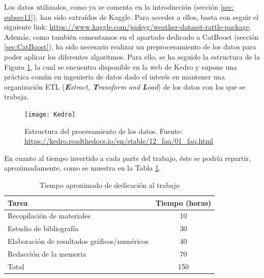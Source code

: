 \documentclass[12pt,twoside]{article}
\begin{document}
Los datos utilizados, como ya se comenta en la introducción (sección \ref{sec: subsec11}), han sido extraídos de Kaggle. Para acceder a ellos, basta con seguir el siguiente link: \url{https://www.kaggle.com/jsphyg/weather-dataset-rattle-package}. Además, como también comentamos en el apartado dedicado a CatBoost (sección \ref{sec:CatBoost}), ha sido necesario realizar un preprocesamiento de los datos para poder aplicar los diferentes algoritmos. Para ello, se ha seguido la estructura de la Figura \ref{fig:Kedro}, la cual se encuentra disponible en la web de Kedro y supone una práctica común en ingenieria de datos dado el interés en mantener una organización ETL (\textit{\textbf{E}xtract, \textbf{T}ransform and \textbf{L}oad}) de los datos con los que se trabaja.
\begin{figure}[h]
\centering
\texttt{[image: Kedro]}
\caption{Estructura del procesamiento de los datos. Fuente: \url{https://kedro.readthedocs.io/en/stable/12_faq/01_faq.html}}
\label{fig:Kedro}
\end{figure}


En cuanto al tiempo invertido a cada parte del trabajo, éste se podría repartir, aproximadamente, como se muestra en la Tabla \ref{tab{02}}.
\begin{table}[ht] 
\centering
\begin{tabular}{lc} 
  \hline
 Tarea & Tiempo (horas) \\ 
  \hline
Recopilación de materiales &   10 \\ 
Estudio de bibliografía &   30\\ 
Elaboración de resultados gráficos/numéricos &  40 \\ 
Redacción de la memoria &  70 \\
 \hline
Total & 150\\
\hline
\end{tabular}
\caption{Tiempo aproximado de dedicación al trabajo} \label{tab{02}}
\end{table}
\end{document}
